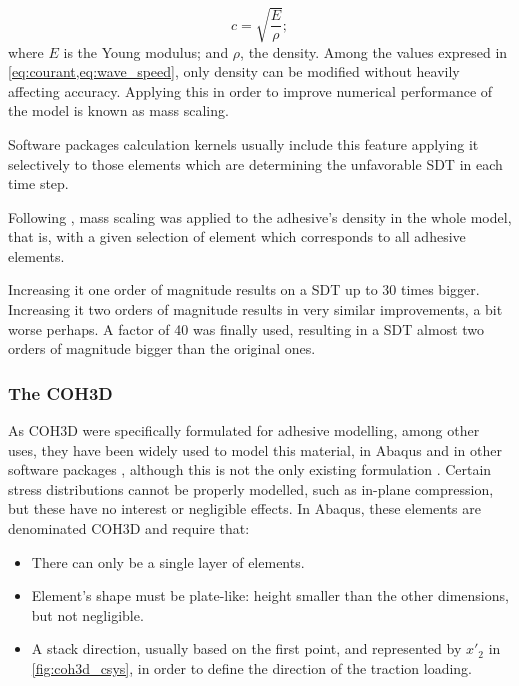 \documentclass[
documentsize = a4, %
font = cmr, %
typesize = 11, %
printmode = true,
onehalfspacing = true,
language = en, %
titlepage = udciccp, %
degree = pt, %
dedication = true,
acknowledgements = true,
abstract-en = true,
abstract-es = false,
abstract-ga = false,
epigraphs = true,
toc = true,
lof = true,
lot = true,
frontmatterintoc = false,
notation = false,
minimal = false,
]{UDCthesis}
\begin{document}
\begin{equation}
c = \sqrt{\frac{E}{\rho}} ;
\label{eq:wave_speed}
\end{equation}
where $E$ is the Young modulus; and $\rho$, the density. Among the values expresed in \cref{eq:courant,eq:wave_speed}, only density can be modified without heavily affecting accuracy. Applying this in order to improve numerical performance of the model is known as mass scaling.

Software packages calculation kernels usually include this feature applying it selectively to those elements which are determining the unfavorable \gls{SDT} in each time step.

Following \citet{Scattina2011}, mass scaling was applied to the adhesive's density in the whole model, that is, with a given selection of element which corresponds to all adhesive elements.

Increasing it one order of magnitude results on a \gls{SDT} up to 30 times bigger. Increasing it two orders of magnitude results in very similar improvements, a bit worse perhaps. A factor of 40 was finally used, resulting in a \gls{SDT} almost two orders of magnitude bigger than the original ones.

\subsubsection{The \acrlong{COH3D}}
\label{sec:coh_elem}

As \acrlong{COH3D} were specifically formulated for adhesive modelling, among other uses, they have been widely used to model this material, in Abaqus \citep{Sadowski2010, Sadowski2011, Sadowski2014, Alvarez2014} and in other software packages \citep{Sato2000, Carlberger2007, Loureiro2010, Scattina2011, Ghasemnejad2013}, although this is not the only existing formulation \citep{Sato2000, Greve2007, Liao2011, Yang2012}. Certain stress distributions cannot be properly modelled, such as in-plane compression, but these have no interest or negligible effects. In Abaqus, these elements are denominated \acrshort{COH3D} and require that:
\begin{itemize}
	\item There can only be a single layer of elements.

	\item Element's shape must be plate-like: height smaller than the other dimensions, but not negligible.

	\item A stack direction, usually based on the first point, and represented by $x'_{2}$ in \cref{fig:coh3d_csys}, in order to define the direction of the traction loading.
\end{itemize}
\end{document}
